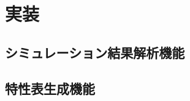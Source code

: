 \chapter{実装}\label{cha:Implementation}

\section{シミュレーション結果解析機能}\label{kyap_re}

\section{特性表生成機能}\label{gazou_input}
